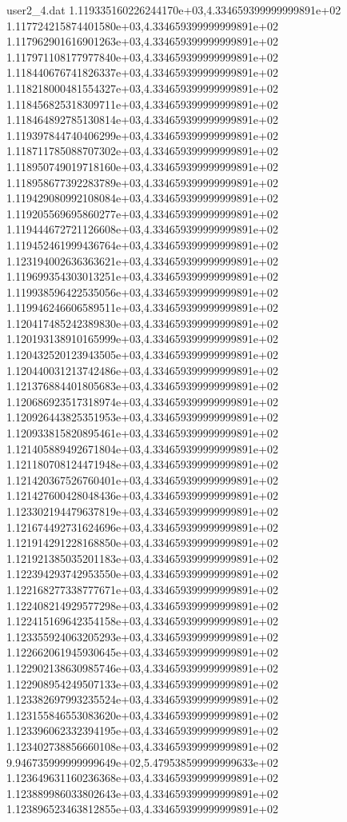 \begin{filecontents}{user2_4.dat}
1.119335160226244170e+03,4.334659399999999891e+02
1.117724215874401580e+03,4.334659399999999891e+02
1.117962901616901263e+03,4.334659399999999891e+02
1.117971108177977840e+03,4.334659399999999891e+02
1.118440676741826337e+03,4.334659399999999891e+02
1.118218000481554327e+03,4.334659399999999891e+02
1.118456825318309711e+03,4.334659399999999891e+02
1.118464892785130814e+03,4.334659399999999891e+02
1.119397844740406299e+03,4.334659399999999891e+02
1.118711785088707302e+03,4.334659399999999891e+02
1.118950749019718160e+03,4.334659399999999891e+02
1.118958677392283789e+03,4.334659399999999891e+02
1.119429080992108084e+03,4.334659399999999891e+02
1.119205569695860277e+03,4.334659399999999891e+02
1.119444672721126608e+03,4.334659399999999891e+02
1.119452461999436764e+03,4.334659399999999891e+02
1.123194002636363621e+03,4.334659399999999891e+02
1.119699354303013251e+03,4.334659399999999891e+02
1.119938596422535056e+03,4.334659399999999891e+02
1.119946246606589511e+03,4.334659399999999891e+02
1.120417485242389830e+03,4.334659399999999891e+02
1.120193138910165999e+03,4.334659399999999891e+02
1.120432520123943505e+03,4.334659399999999891e+02
1.120440031213742486e+03,4.334659399999999891e+02
1.121376884401805683e+03,4.334659399999999891e+02
1.120686923517318974e+03,4.334659399999999891e+02
1.120926443825351953e+03,4.334659399999999891e+02
1.120933815820895461e+03,4.334659399999999891e+02
1.121405889492671804e+03,4.334659399999999891e+02
1.121180708124471948e+03,4.334659399999999891e+02
1.121420367526760401e+03,4.334659399999999891e+02
1.121427600428048436e+03,4.334659399999999891e+02
1.123302194479637819e+03,4.334659399999999891e+02
1.121674492731624696e+03,4.334659399999999891e+02
1.121914291228168850e+03,4.334659399999999891e+02
1.121921385035201183e+03,4.334659399999999891e+02
1.122394293742953550e+03,4.334659399999999891e+02
1.122168277338777671e+03,4.334659399999999891e+02
1.122408214929577298e+03,4.334659399999999891e+02
1.122415169642354158e+03,4.334659399999999891e+02
1.123355924063205293e+03,4.334659399999999891e+02
1.122662061945930645e+03,4.334659399999999891e+02
1.122902138630985746e+03,4.334659399999999891e+02
1.122908954249507133e+03,4.334659399999999891e+02
1.123382697993235524e+03,4.334659399999999891e+02
1.123155846553083620e+03,4.334659399999999891e+02
1.123396062332394195e+03,4.334659399999999891e+02
1.123402738856660108e+03,4.334659399999999891e+02
9.946735999999999649e+02,5.479538599999999633e+02
1.123649631160236368e+03,4.334659399999999891e+02
1.123889986033802643e+03,4.334659399999999891e+02
1.123896523463812855e+03,4.334659399999999891e+02

\end{filecontents}
